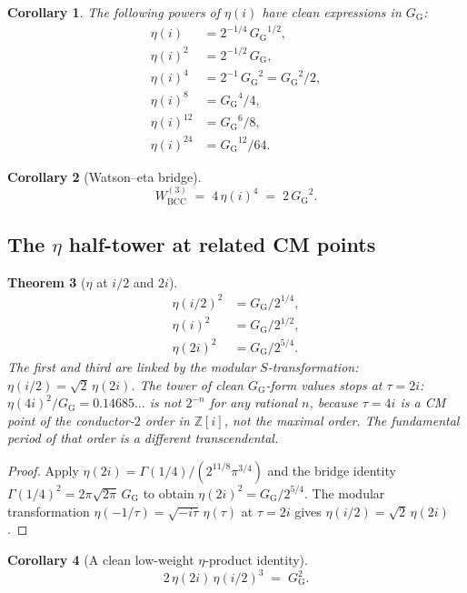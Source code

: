 \documentclass[11pt]{article}
\newtheorem{theorem}{Theorem}[section]
\newtheorem{corollary}[theorem]{Corollary}
\theoremstyle{definition}
\theoremstyle{remark}
\newcommand{\GG}{G_{\!\scriptscriptstyle\mathrm{G}}}
\newcommand{\Z}{\mathbb{Z}}
\begin{document}
\begin{corollary}\label{cor:eta-powers}
The following powers of $\eta(i)$ have clean expressions in $\GG$:
\begin{align*}
\eta(i) &= 2^{-1/4}\,{\GG}^{1/2}, \\
\eta(i)^2 &= 2^{-1/2}\,\GG, \\
\eta(i)^4 &= 2^{-1}\,{\GG}^2 = {\GG}^2/2, \\
\eta(i)^8 &= {\GG}^4/4, \\
\eta(i)^{12} &= {\GG}^6/8, \\
\eta(i)^{24} &= {\GG}^{12}/64.
\end{align*}
\end{corollary}

\begin{corollary}[Watson--eta bridge]\label{cor:watson-eta}
\[
W^{(3)}_{\mathrm{BCC}} \;=\; 4\,\eta(i)^4 \;=\; 2\,{\GG}^2.
\]
\end{corollary}

\subsection{The $\eta$ half-tower at related CM points}

\begin{theorem}[$\eta$ at $i/2$ and $2i$]\label{thm:eta-half-tower}
\begin{align}
\eta(i/2)^2 &= \GG / 2^{1/4}, \\
\eta(i)^2 &= \GG / 2^{1/2}, \\
\eta(2i)^2 &= \GG / 2^{5/4}.
\end{align}
The first and third are linked by the modular $S$-transformation:
$\eta(i/2) = \sqrt 2\,\eta(2i)$. The tower of clean $\GG$-form values
\emph{stops} at $\tau = 2i$: $\eta(4i)^2/\GG = 0.14685\ldots$ is not
$2^{-n}$ for any rational $n$, because $\tau = 4i$ is a CM point of the
conductor-$2$ order in $\Z[i]$, not the maximal order. The fundamental
period of that order is a different transcendental.
\end{theorem}

\begin{proof}
Apply $\eta(2i) = \Gamma(1/4)/(2^{11/8}\pi^{3/4})$ and the bridge identity
$\Gamma(1/4)^2 = 2\pi\sqrt{2\pi}\,\GG$ to obtain
$\eta(2i)^2 = \GG/2^{5/4}$. The modular transformation
$\eta(-1/\tau) = \sqrt{-i\tau}\,\eta(\tau)$ at $\tau = 2i$ gives
$\eta(i/2) = \sqrt 2\,\eta(2i)$.
\end{proof}

\begin{corollary}[A clean low-weight $\eta$-product identity]\label{cor:eta-low-weight}
\[
2\,\eta(2i)\,\eta(i/2)^{3} \;=\; \GG^{2}.
\]
\end{corollary}
\end{document}
